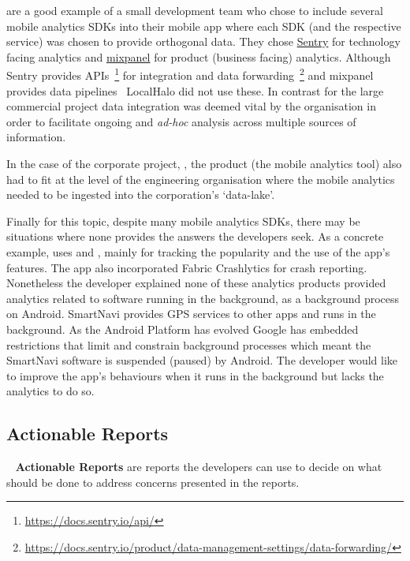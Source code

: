  are a good example of a small development team who chose to include several mobile analytics SDKs into their mobile app where each SDK (and the respective service) was chosen to provide orthogonal data. They chose \href{https://sentry.io/}{Sentry} for technology facing analytics and \href{https://mixpanel.com/}{mixpanel} for product (business facing) analytics. Although Sentry provides APIs~\footnote{\url{https://docs.sentry.io/api/}} for integration and data forwarding~\footnote{\url{https://docs.sentry.io/product/data-management-settings/data-forwarding/}} and mixpanel provides data pipelines~ LocalHalo did not use these. In contrast for the large commercial project data integration was deemed vital by the organisation in order to facilitate ongoing and \emph{ad-hoc} analysis across multiple sources of information. 

In the case of the corporate project, , the product (the mobile analytics tool) also had to fit at the level of the engineering organisation where the mobile analytics needed to be ingested into the corporation's `data-lake'. 

Finally for this topic, despite many mobile analytics SDKs, there may be situations where none provides the answers the developers seek. As a concrete example,  uses  and , mainly for tracking the popularity and the use of the app's features. The app also incorporated Fabric Crashlytics for crash reporting. Nonetheless the developer explained none of these analytics products provided analytics related to software running in the background, as a background process on Android. SmartNavi provides GPS services to other apps and runs in the background. As the Android Platform has evolved Google has embedded restrictions that limit and constrain background processes which meant the SmartNavi software is suspended (paused) by Android. The developer would like to improve the app's behaviours when it runs in the background but lacks the analytics to do so.

\subsection{Actionable Reports}~\label{tata-actionable-reports-topic}
\textbf{Actionable Reports} are reports the developers can use to decide on what should be done to address concerns presented in the reports. %

